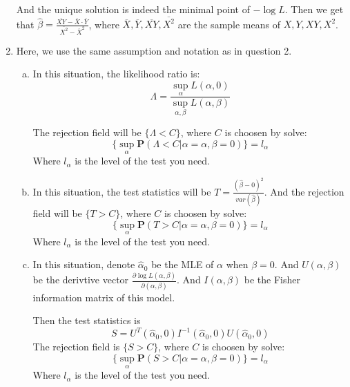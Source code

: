 \documentclass[12pt]{article}
\newcommand{\prob}[1]{\textbf{P}(#1)}
\newcommand{\var}[1]{var \left( #1 \right)}
\begin{document}
\begin{enumerate}
    And the unique solution is indeed the minimal point of $-\log{L}$. Then we get that $\hat{\beta} = \frac{\overline{XY} - \overline{X} \cdot \overline{Y}}{\overline{X^2} - \overline{X}^2}$, where $\overline{X}, \overline{Y}, \overline{XY}, \overline{X^2}$ are the sample means of $X, Y, XY, X^2$.
    
    \item
    Here, we use the same assumption and notation as in question 2.
    \begin{enumerate}[(a)]
        \item 
        In this situation, the likelihood ratio is:
        $$\Lambda = \frac{\sup_{\alpha} L(\alpha, 0)}{\sup_{\alpha, \beta} L(\alpha, \beta)}$$

        The rejection field will be $\{\Lambda < C\}$, where $C$ is choosen by solve:
        $$ \{\sup_{\alpha} \prob{\Lambda < C | \alpha = \alpha, \beta = 0}\} = l_\alpha $$
        Where $l_\alpha$ is the level of the test you need.

        \item
        In this situation, the test statistics will be $T = \frac{(\hat{\beta} - 0)^2}{\var{\hat{\beta}}}$.
        And the rejection field will be $\{T > C\}$, where $C$ is choosen by solve:
        $$ \{\sup_{\alpha} \prob{T > C | \alpha = \alpha, \beta = 0}\} = l_\alpha $$
        Where $l_\alpha$ is the level of the test you need.

        \item
        In this situation, denote $\hat{\alpha}_0$ be the MLE of $\alpha$ when $\beta = 0$. And $U(\alpha, \beta)$ be the derivtive vector $\frac{\partial \log{L}(\alpha,\beta)}{\partial(\alpha, \beta)}$.
        And $I(\alpha, \beta)$ be the Fisher information matrix of this model.

        Then the test statistics is
        $$ S = U^T(\hat{\alpha}_0,0) I^{-1}(\hat{\alpha}_0,0) U(\hat{\alpha}_0,0) $$
        The rejection field is $\{S > C\}$, where $C$ is choosen by solve:
        $$ \{\sup_{\alpha} \prob{S > C | \alpha = \alpha, \beta = 0}\} = l_\alpha $$
        Where $l_\alpha$ is the level of the test you need.

    \end{enumerate} 

\end{enumerate}
\end{document}
